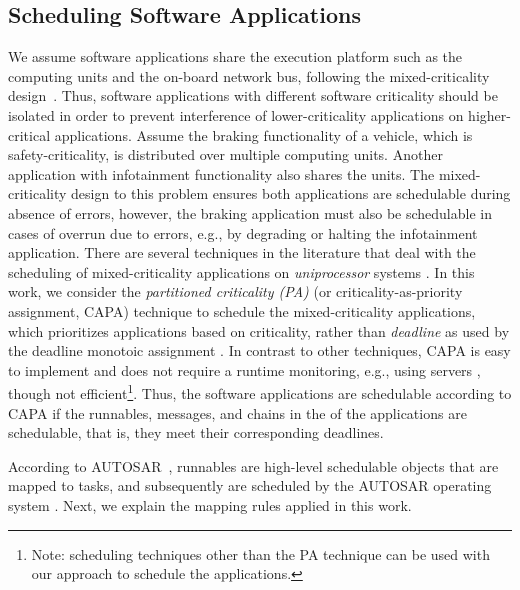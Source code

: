 \subsection{Scheduling Software Applications}
We assume software applications share the execution platform such as the computing units and the on-board network bus, following the mixed-criticality design~\cite{Vestal2007PreemptiveAssurance}. Thus, software applications with different software criticality should be isolated in order to prevent interference of lower-criticality applications on higher-critical applications. Assume the braking functionality of a vehicle, which is safety-criticality, is distributed over multiple computing units. Another application with infotainment functionality also shares the units. The mixed-criticality design to this problem ensures both applications are schedulable during absence of errors, however, the braking application must also be schedulable in cases of overrun due to errors, e.g., by degrading or halting the infotainment application. There are several techniques in the literature that deal with the scheduling of mixed-criticality applications on \textit{uniprocessor} systems \cite{Vestal2007PreemptiveAssurance}. In this work, we consider the \textit{partitioned criticality (PA)} (or criticality-as-priority assignment, CAPA) technique to schedule the mixed-criticality applications, which prioritizes applications based on criticality, rather than \textit{deadline} as used by the deadline monotoic assignment \cite{Baruah2011Response-timeSystems}. In contrast to other techniques, CAPA is easy to implement and does not require a runtime monitoring, e.g., using servers \cite{AbeniIntegratingSystems,Ashjaei2017DesigningSystems,Inam2014ThePlatforms}, though not efficient\footnote{Note: scheduling techniques other than the PA technique can be used with our approach to schedule the applications.}. Thus, the software  applications are schedulable according to CAPA if the runnables, messages, and chains in the of the applications are schedulable, that is, they meet their corresponding deadlines. 

According to AUTOSAR~\cite{AUTOSAR2017SpecificationSoftware}, runnables are high-level schedulable objects that are mapped to tasks, and subsequently are scheduled by the AUTOSAR operating system \cite{AUTOSAR2018Specification4.2.2}. Next, we explain the mapping rules applied in this work.

